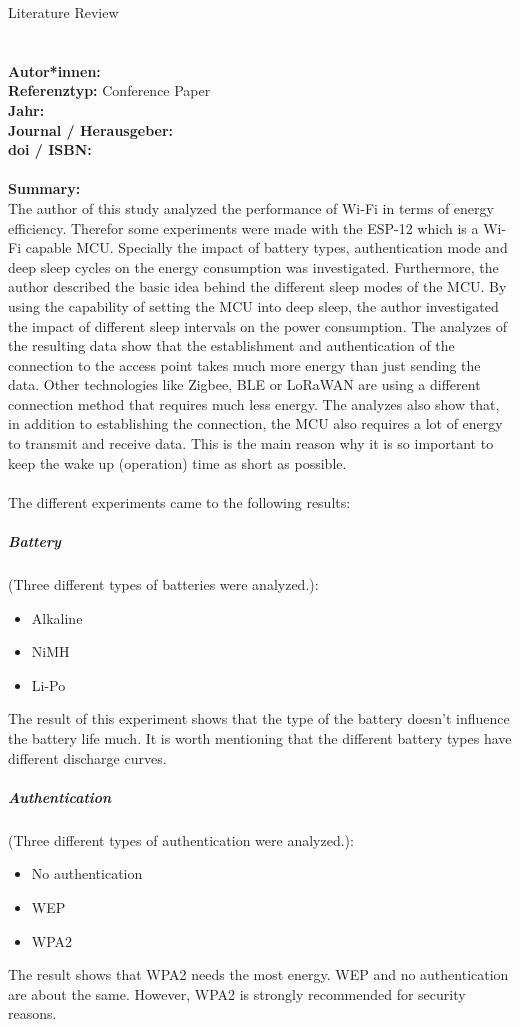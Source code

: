 \documentclass{report}
\newcommand{\createConferencePaperHeader}[1]{
    {\let\clearpage\relax \chapter{\citetitle{#1}}}
    \noindent
    \textbf{Autor*innen:} \citeauthor{#1} \\
    \textbf{Referenztyp:} Conference Paper\\
    \textbf{Jahr:} \citeyear{#1} \\
    \textbf{Journal / Herausgeber:} \citelist{#1}{publisher}\\
    \textbf{doi / ISBN:} \citefield{#1}{doi} \\\\
    \textbf{Summary:}\\
}
\begin{document}
{\LARGE Literature Review}


\createConferencePaperHeader{montori_is_2017}
The author of this study analyzed the performance of Wi-Fi in terms of energy efficiency.
Therefor some experiments were made with the ESP-12 which is a Wi-Fi capable MCU.
Specially the impact of battery types, authentication mode and deep sleep cycles on the energy consumption was investigated.
Furthermore, the author described the basic idea behind the different sleep modes of the MCU.
By using the capability of setting the MCU into deep sleep, the author investigated the impact of different
sleep intervals on the power consumption. 
The analyzes of the resulting data show that the establishment and authentication of the connection to the access point takes much more
energy than just sending the data. Other technologies like Zigbee, BLE or LoRaWAN are using a different connection method that requires much less energy.
The analyzes also show that, in addition to establishing the connection, the MCU also requires a lot of energy to transmit and receive data.
This is the main reason why it is so important to keep the wake up (operation) time as short as possible.
\\
\\
The different experiments came to the following results:\\
\paragraph{Battery} (Three different types of batteries were analyzed.):
\begin{itemize}
    \item Alkaline
    \item NiMH
    \item Li-Po
\end{itemize}
The result of this experiment shows that the type of the battery doesn't influence the battery life much.
It is worth mentioning that the different battery types have different discharge curves.

\paragraph{Authentication} (Three different types of authentication were analyzed.):
\begin{itemize}
    \item No authentication
    \item WEP
    \item WPA2
\end{itemize}
The result shows that WPA2 needs the most energy. WEP and no authentication are about the same.
However, WPA2 is strongly recommended for security reasons.
\end{document}

